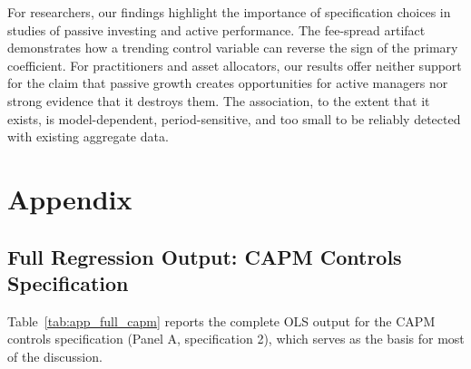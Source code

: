 \documentclass[11pt, a4paper]{article}
\begin{document}
For researchers, our findings highlight the importance of specification choices in studies of passive investing and active performance. The fee-spread artifact demonstrates how a trending control variable can reverse the sign of the primary coefficient. For practitioners and asset allocators, our results offer neither support for the claim that passive growth creates opportunities for active managers nor strong evidence that it destroys them. The association, to the extent that it exists, is model-dependent, period-sensitive, and too small to be reliably detected with existing aggregate data.


\newpage
\printbibliography[title={References}]


\newpage
\appendix
\section{Appendix}
\label{sec:appendix}

\subsection{Full Regression Output: CAPM Controls Specification}
\label{app:full_output}

Table~\ref{tab:app_full_capm} reports the complete OLS output for the CAPM controls specification (Panel A, specification 2), which serves as the basis for most of the discussion.
\end{document}
